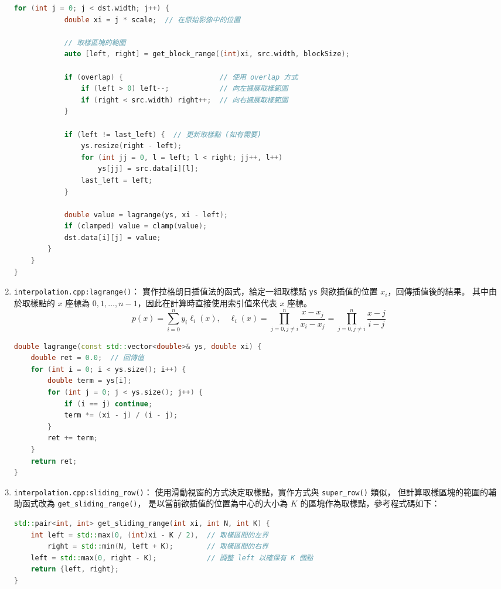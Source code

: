 \documentclass[a4paper,  10pt, oneside, fleqn]{article}
\begin{document}
\begin{enumerate}
\begin{lstlisting}[language=C++]
        for (int j = 0; j < dst.width; j++) {
            double xi = j * scale;  // 在原始影像中的位置

            // 取樣區塊的範圍
            auto [left, right] = get_block_range((int)xi, src.width, blockSize);

            if (overlap) {                       // 使用 overlap 方式
                if (left > 0) left--;            // 向左擴展取樣範圍
                if (right < src.width) right++;  // 向右擴展取樣範圍
            }

            if (left != last_left) {  // 更新取樣點 (如有需要)
                ys.resize(right - left);
                for (int jj = 0, l = left; l < right; jj++, l++)
                    ys[jj] = src.data[i][l];
                last_left = left;
            }

            double value = lagrange(ys, xi - left);
            if (clamped) value = clamp(value);
            dst.data[i][j] = value;
        }
    }
}
    \end{lstlisting}

    \item \lstinline|interpolation.cpp:lagrange()|：
          實作拉格朗日插值法的函式，給定一組取樣點 \lstinline|ys| 與欲插值的位置 $x_i$，回傳插值後的結果。
          其中由於取樣點的 $x$ 座標為 $0, 1, \ldots, n-1$，因此在計算時直接使用索引值來代表 $x$ 座標。
          \begin{equation*}
              p(x) = \sum_{i=0}^{n} y_i \ell_i(x), \quad
              \ell_i(x) = \prod_{j=0, j \neq i}^{n} \frac{x - x_j}{x_i - x_j}
              = \prod_{j=0, j \neq i}^{n} \frac{x - j}{i - j}
          \end{equation*}
          \begin{lstlisting}[language=C++]
double lagrange(const std::vector<double>& ys, double xi) {
    double ret = 0.0;  // 回傳值
    for (int i = 0; i < ys.size(); i++) {
        double term = ys[i];
        for (int j = 0; j < ys.size(); j++) {
            if (i == j) continue;
            term *= (xi - j) / (i - j);
        }
        ret += term;
    }
    return ret;
}
    \end{lstlisting}

    \item \lstinline|interpolation.cpp:sliding_row()|：
          使用滑動視窗的方式決定取樣點，實作方式與 \lstinline|super_row()| 類似，
          但計算取樣區塊的範圍的輔助函式改為 \lstinline|get_sliding_range()|，
          是以當前欲插值的位置為中心的大小為 $K$ 的區塊作為取樣點，參考程式碼如下：
          \begin{lstlisting}[language=C++]
std::pair<int, int> get_sliding_range(int xi, int N, int K) {
    int left = std::max(0, (int)xi - K / 2),  // 取樣區間的左界
        right = std::min(N, left + K);        // 取樣區間的右界
    left = std::max(0, right - K);            // 調整 left 以確保有 K 個點
    return {left, right};
}
\end{lstlisting}
\end{enumerate}
\end{document}
